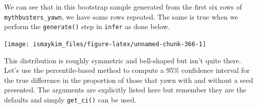 \documentclass[12pt,]{krantz}
\makeatletter
\newenvironment{Shaded}{\begin{snugshade}}{\end{snugshade}}
\newcommand{\KeywordTok}[1]{\textcolor[rgb]{0.27,0.27,0.27}{\textbf{#1}}}
\newcommand{\DataTypeTok}[1]{\textcolor[rgb]{0.27,0.27,0.27}{#1}}
\newcommand{\DecValTok}[1]{\textcolor[rgb]{0.06,0.06,0.06}{#1}}
\newcommand{\FloatTok}[1]{\textcolor[rgb]{0.06,0.06,0.06}{#1}}
\newcommand{\StringTok}[1]{\textcolor[rgb]{0.5,0.5,0.5}{#1}}
\newcommand{\OperatorTok}[1]{\textcolor[rgb]{0.43,0.43,0.43}{\textbf{#1}}}
\newcommand{\NormalTok}[1]{#1}
\newenvironment{kframe}{%
\medskip{}
\setlength{\fboxsep}{.8em}
 \def\at@end@of@kframe{}%
 \ifinner\ifhmode%
  \def\at@end@of@kframe{\end{minipage}}%
  \begin{minipage}{\columnwidth}%
 \fi\fi%
 \def\FrameCommand##1{\hskip\@totalleftmargin \hskip-\fboxsep
 \colorbox{shadecolor}{##1}\hskip-\fboxsep
     \hskip-\linewidth \hskip-\@totalleftmargin \hskip\columnwidth}%
 \MakeFramed {\advance\hsize-\width
   \@totalleftmargin\z@ \linewidth\hsize
   \@setminipage}}%
 {\par\unskip\endMakeFramed%
 \at@end@of@kframe}
\renewenvironment{Shaded}{\begin{kframe}}{\end{kframe}}
\theoremstyle{definition}
\theoremstyle{definition}
\theoremstyle{definition}
\theoremstyle{remark}
\makeatother
\begin{document}
We can see that in this bootstrap sample generated from the first six
rows of \texttt{mythbusters\_yawn}, we have some rows repeated. The same
is true when we perform the \texttt{generate()} step in \texttt{infer}
as done below.

\begin{Shaded}
\end{Shaded}

\begin{Shaded}
\end{Shaded}

\begin{center}\texttt{[image: ismaykim\_files/figure-latex/unnamed-chunk-366-1]} \end{center}

This distribution is roughly symmetric and bell-shaped but isn't quite
there. Let's use the percentile-based method to compute a 95\%
confidence interval for the true difference in the proportion of those
that yawn with and without a seed presented. The arguments are
explicitly listed here but remember they are the defaults and simply
\texttt{get\_ci()} can be used.

\begin{Shaded}
\end{Shaded}
\end{document}
